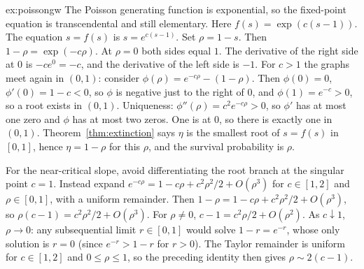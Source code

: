 \begin{solution}{ex:poissongw}
\idea The Poisson generating function is exponential, so the fixed-point equation is transcendental and still elementary.
\writeup Here $f(s)=\exp(c(s-1))$. The equation $s=f(s)$ is $s=e^{c(s-1)}$. Set $\rho=1-s$. Then $1-\rho=\exp(-c\rho)$. At $\rho=0$ both sides equal $1$. The derivative of the right side at $0$ is $-c e^{0}=-c$, and the derivative of the left side is $-1$. For $c>1$ the graphs meet again in $(0,1)$: consider $\phi(\rho)=e^{-c\rho}-(1-\rho)$. Then $\phi(0)=0$, $\phi'(0)=1-c<0$, so $\phi$ is negative just to the right of $0$, and $\phi(1)=e^{-c}>0$, so a root exists in $(0,1)$. Uniqueness: $\phi''(\rho)=c^2 e^{-c\rho}>0$, so $\phi'$ has at most one zero and $\phi$ has at most two zeros. One is at $0$, so there is exactly one in $(0,1)$. Theorem~\ref{thm:extinction} says $\eta$ is the smallest root of $s=f(s)$ in $[0,1]$, hence $\eta=1-\rho$ for this $\rho$, and the survival probability is $\rho$.

For the near-critical slope, avoid differentiating the root branch at the singular point $c=1$. Instead expand $e^{-c\rho}=1-c\rho+c^2\rho^2/2+O(\rho^3)$ for $c\in[1,2]$ and $\rho\in[0,1]$, with a uniform remainder. Then $1-\rho=1-c\rho+c^2\rho^2/2+O(\rho^3)$, so $\rho(c-1)=c^2\rho^2/2+O(\rho^3)$. For $\rho\ne0$, $c-1=c^2\rho/2+O(\rho^2)$. As $c\downarrow1$, $\rho\to0$: any subsequential limit $r\in[0,1]$ would solve $1-r=e^{-r}$, whose only solution is $r=0$ (since $e^{-r}>1-r$ for $r>0$). The Taylor remainder is uniform for $c\in[1,2]$ and $0\le\rho\le1$, so the preceding identity then gives $\rho\sim2(c-1)$.
\end{solution}


